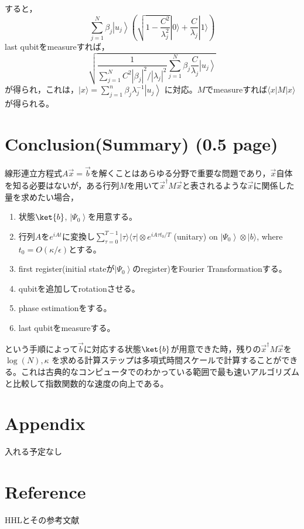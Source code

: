 \documentclass[b5paper,papersize,dvipdfmx,fleqn]{jsarticle}
\begin{document}
すると，
$$
\sum_{j=1}^{N} \beta_{j}\left|u_{j}\right\rangle\left(\sqrt{1-\frac{C^{2}}{\lambda_{j}^{2}}}|0\rangle+\frac{C}{\lambda_{j}}|1\rangle\right)
$$
last qubitをmeasureすれば，
$$
\sqrt{\frac{1}{\sum_{j=1}^{N} C^{2}\left|\beta_{j}\right|^{2} /\left|\lambda_{j}\right|^{2}} \sum_{j=1}^{N} \beta_{j} \frac{C}{\lambda_{j}}\left|u_{j}\right\rangle}
$$
が得られ，これは，$|x\rangle=\sum_{j=1}^{n} \beta_{j} \lambda_{j}^{-1}\left|u_{j}\right\rangle$ に対応。$M$でmeasureすれば$\langle x|M| x\rangle$が得られる。
%
%


\section{Conclusion(Summary) (0.5 page)}
線形連立方程式$A\vec{x}=\vec{b}$を解くことはあらゆる分野で重要な問題であり，$\vec{x}$自体を知る必要はないが，ある行列$M$を用いて$\vec{x}^\dagger M \vec{x}$と表されるような$\vec{x}$に関係した量を求めたい場合，
\begin{enumerate}
  \item 状態$\ket{b}$, $\left|\Psi_{0}\right\rangle$を用意する。
  \item 行列$A$を$e^{iAt}$に変換し$\displaystyle \sum_{\tau=0}^{T-1}|\tau\rangle\langle\tau| \otimes e^{i A \tau t_{0} / T}$ (unitary) on $\left|\Psi_{0}\right\rangle \otimes|b\rangle$, where $t_{0}=O(\kappa / \epsilon)$とする。
  \item first register(initial stateが$\left|\Psi_{0}\right\rangle$のregister)をFourier Transformationする。
  \item qubitを追加してrotationさせる。
  \item phase estimationをする。
  \item last qubitをmeasureする。
\end{enumerate}
という手順によって$\vec{b}$に対応する状態$\ket{b}$が用意できた時，残りの$\vec{x}^\dagger M \vec{x}$を$\log(N),\kappa $ を求める計算ステップは多項式時間スケールで計算することができる。これは古典的なコンピュータでのわかっている範囲で最も速いアルゴリズムと比較して指数関数的な速度の向上である。

\section{Appendix}
入れる予定なし

\section{Reference}
HHLとその参考文献
\end{document}
